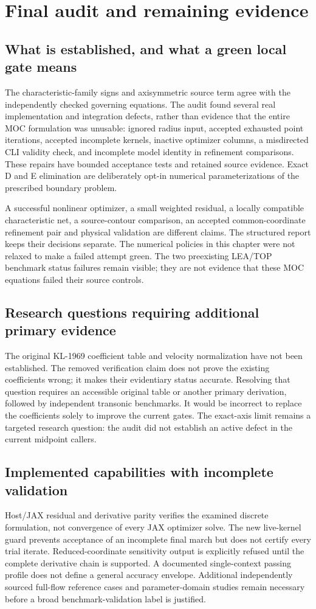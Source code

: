 \section{Final audit and remaining evidence}
\subsection{What is established, and what a green local gate means}
The characteristic-family signs and axisymmetric source term agree with the
independently checked governing equations. The audit found several real
implementation and integration defects, rather than evidence that the entire
MOC formulation was unusable: ignored radius input, accepted exhausted point
iterations, accepted incomplete kernels, inactive optimizer columns, a
misdirected CLI validity check, and incomplete model identity in refinement
comparisons. These repairs have bounded acceptance tests and retained source
evidence. Exact D and E elimination are deliberately opt-in numerical
parameterizations of the prescribed boundary problem.

A successful nonlinear optimizer, a small weighted residual, a locally
compatible characteristic net, a source-contour comparison, an accepted
common-coordinate refinement pair and physical validation are different
claims. The structured report keeps their decisions separate. The numerical
policies in this chapter were not relaxed to make a failed attempt green.
The two preexisting LEA/TOP benchmark status failures remain visible; they
are not evidence that these MOC equations failed their source controls.

\subsection{Research questions requiring additional primary evidence}
The original KL-1969 coefficient table and velocity normalization have not
been established. The removed verification claim does not prove the existing
coefficients wrong; it makes their evidentiary status accurate. Resolving
that question requires an accessible original table or another primary
derivation, followed by independent transonic benchmarks. It would be
incorrect to replace the coefficients solely to improve the current gates.
The exact-axis limit remains a targeted research question: the audit did not
establish an active defect in the current midpoint callers.

\subsection{Implemented capabilities with incomplete validation}
Host/JAX residual and derivative parity verifies the examined discrete
formulation, not convergence of every JAX optimizer solve. The new live-kernel
guard prevents acceptance of an incomplete final march but does not certify
every trial iterate. Reduced-coordinate sensitivity output is explicitly
refused until the complete derivative chain is supported. A documented
single-context passing profile does not define a general accuracy envelope.
Additional independently sourced full-flow reference cases and parameter-domain
studies remain necessary before a broad benchmark-validation label is justified.

